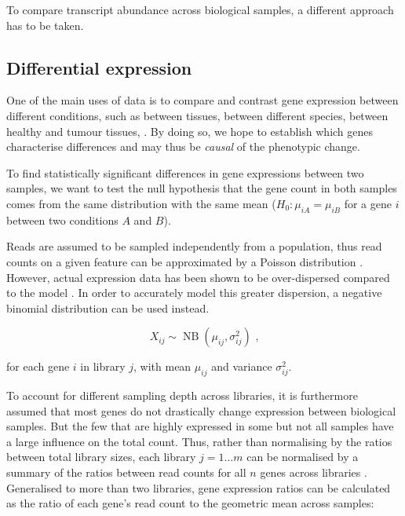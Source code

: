 To compare transcript abundance across biological samples, a different approach
has to be taken.

\subsection{Differential expression}

One of the main uses of \rnaseq data is to compare and contrast gene expression
between different conditions, such as between tissues, between different
species, between healthy and tumour tissues, \etc. By doing so, we hope to
establish which genes characterise differences and may thus be \emph{causal} of
the phenotypic change.

To find statistically significant differences in gene expressions between two
samples, we want to test the null hypothesis that the gene count in both samples
comes from the same distribution with the same mean (\(H_0: \mu_{iA} =
\mu_{iB}\) for a gene \(i\) between two conditions \(A\) and \(B\)).

Reads are assumed to be sampled independently from a population, thus read
counts on a given feature can be approximated by a Poisson distribution
\citep{Mortazavi:2008, Marioni:2008}. However, actual expression data has been
shown to be over-dispersed compared to the model \citep{Robinson:2007}. In order
to accurately model this greater dispersion, a negative binomial distribution
can be used instead.

\begin{equation}
    X_{ij} \sim \operatorname{NB}(\mu_{ij}, \sigma^2_{ij}) \text{\ ,}
\end{equation}

for each gene \(i\) in library \(j\), with mean \(\mu_{ij}\) and variance
\(\sigma^2_{ij}\).

To account for different sampling depth across libraries, it is furthermore
assumed that most genes do not drastically change expression between biological
samples. But the few that are highly expressed in some but not all samples have
a large influence on the total count. Thus, rather than normalising by the
ratios between total library sizes, each library \(j = 1 \dots m\) can be
normalised by a summary of the ratios between read counts for all \(n\) genes
across libraries \citep{Robinson:2010a,Anders:2010}. Generalised to more than
two libraries, gene expression ratios can be calculated as the ratio of each
gene’s read count to the geometric mean across samples:

